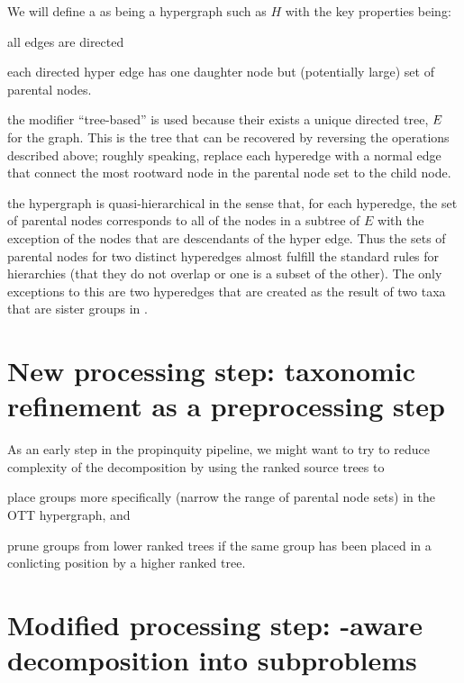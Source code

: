 \documentclass[11pt]{article}
\begin{document}
We will define a \specialHypergraph as being a hypergraph such as $H$ with the key properties being:
\begin{compactitem}
    \item all edges are directed
    \item each directed hyper edge has one daughter node but (potentially large) set of parental nodes.
    \item the modifier ``tree-based'' is used because their exists a unique directed tree,
    $E$ for the graph. This is the tree that can be recovered by reversing the 
    operations described above; roughly speaking, replace each hyperedge with a normal edge that connect 
    the most rootward node in the parental node set to the child node.
    \item the hypergraph is quasi-hierarchical in the sense that, for each hyperedge, the set of parental
        nodes corresponds to all of the nodes in a subtree of $E$ with the exception of the nodes
        that are descendants of the hyper edge.
        Thus the sets of parental nodes for two distinct hyperedges almost fulfill the standard
        rules for hierarchies (that they do not overlap or one is a subset of the other).
        The only exceptions to this are two hyperedges that are created as the result of two 
        \insed taxa that are sister groups in \naiveFullTree.
\end{compactitem}

\section{New processing step: taxonomic refinement as a preprocessing step}
As an early step in the propinquity pipeline, we might want to try to reduce complexity of the
    decomposition by using the ranked source trees to
\begin{compactenum}
    \item place \insed groups more specifically (narrow the range of parental node sets) in the OTT hypergraph, and
    \item prune \insed groups from lower ranked trees if the same \insed group has been placed in a 
        conlicting position by a higher ranked tree.
\end{compactenum}

\section{Modified processing step: \insed-aware decomposition into subproblems}
\end{document}

